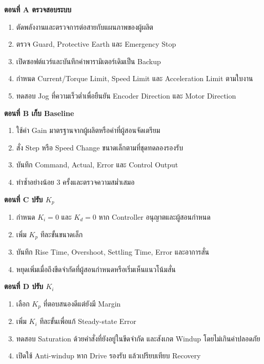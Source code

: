 \textbf{ตอนที่ A ตรวจสอบระบบ}

\begin{enumerate}
    \item ตัดพลังงานและตรวจการต่อสายกับแผนภาพของผู้ผลิต
    \item ตรวจ Guard, Protective Earth และ Emergency Stop
    \item เปิดซอฟต์แวร์และบันทึกค่าพารามิเตอร์เดิมเป็น Backup
    \item กำหนด Current/Torque Limit, Speed Limit และ Acceleration Limit ตามใบงาน
    \item ทดสอบ Jog ที่ความเร็วต่ำเพื่อยืนยัน Encoder Direction และ Motor Direction
\end{enumerate}

\textbf{ตอนที่ B เก็บ Baseline}

\begin{enumerate}
    \item ใช้ค่า Gain มาตรฐานจากผู้ผลิตหรือค่าที่ผู้สอนจัดเตรียม
    \item สั่ง Step หรือ Speed Change ขนาดเล็กตามที่ชุดทดลองรองรับ
    \item บันทึก Command, Actual, Error และ Control Output
    \item ทำซ้ำอย่างน้อย 3 ครั้งและตรวจความสม่ำเสมอ
\end{enumerate}

\textbf{ตอนที่ C ปรับ $K_p$}

\begin{enumerate}
    \item กำหนด $K_i=0$ และ $K_d=0$ หาก Controller อนุญาตและผู้สอนกำหนด
    \item เพิ่ม $K_p$ ทีละขั้นขนาดเล็ก
    \item บันทึก Rise Time, Overshoot, Settling Time, Error และอาการสั่น
    \item หยุดเพิ่มเมื่อถึงขีดจำกัดที่ผู้สอนกำหนดหรือเริ่มเห็นแนวโน้มสั่น
\end{enumerate}

\textbf{ตอนที่ D ปรับ $K_i$}

\begin{enumerate}
    \item เลือก $K_p$ ที่ตอบสนองดีแต่ยังมี Margin
    \item เพิ่ม $K_i$ ทีละขั้นเพื่อแก้ Steady-state Error
    \item ทดสอบ Saturation ด้วยคำสั่งที่ยังอยู่ในขีดจำกัด และสังเกต Windup โดยไม่เกินค่าปลอดภัย
    \item เปิดใช้ Anti-windup หาก Drive รองรับ แล้วเปรียบเทียบ Recovery
\end{enumerate}

